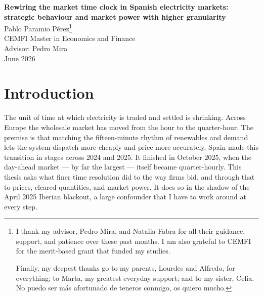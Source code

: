 \documentclass[11pt,a4paper]{article}
\theoremstyle{definition}
\theoremstyle{remark}
\theoremstyle{plain}
\begin{document}
\clearpage
{}  %

\begin{center}
{\Large\bfseries Rewiring the market time clock in Spanish electricity markets:\\[2pt]
strategic behaviour and market power with higher granularity}\\[12pt]
{\large Pablo Paramio P\'erez\renewcommand{\thefootnote}{\fnsymbol{footnote}}\setcounter{footnote}{0}\footnote{I thank my advisor, Pedro Mira, and Natalia Fabra for all their guidance, support, and patience over these past months. I am also grateful to CEMFI for the merit-based grant that funded my studies.

Finally, my deepest thanks go to my parents, Lourdes and Alfredo, for everything; to Marta, my greatest everyday support; and to my sister, Celia. No puedo ser más afortunado de teneros conmigo, os quiero mucho.}}\\[5pt]
CEMFI Master in Economics and Finance\\[2pt]
Advisor: Pedro Mira\\[2pt]
June 2026
\end{center}
\setcounter{footnote}{0}
\vspace{12pt}

\section{Introduction}\label{sec:intro}

The unit of time at which electricity is traded and settled is shrinking. Across Europe the wholesale market has moved from the hour to the quarter-hour. The premise is that matching the fifteen-minute rhythm of renewables and demand lets the system dispatch more cheaply and price more accurately. Spain made this transition in stages across 2024 and 2025. It finished in October 2025, when the day-ahead market --- by far the largest --- itself became quarter-hourly. This thesis asks what finer time resolution did to the way firms bid, and through that to prices, cleared quantities, and market power. It does so in the shadow of the April 2025 Iberian blackout, a large confounder that I have to work around at every step.
\end{document}
